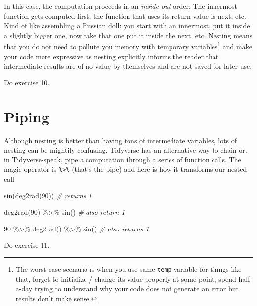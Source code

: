\documentclass[
]{book}
\newenvironment{Shaded}{\begin{snugshade}}{\end{snugshade}}
\newcommand{\CommentTok}[1]{\textcolor[rgb]{0.56,0.35,0.01}{\textit{#1}}}
\newcommand{\DecValTok}[1]{\textcolor[rgb]{0.00,0.00,0.81}{#1}}
\newcommand{\FunctionTok}[1]{\textcolor[rgb]{0.00,0.00,0.00}{#1}}
\newcommand{\NormalTok}[1]{#1}
\newcommand{\SpecialCharTok}[1]{\textcolor[rgb]{0.00,0.00,0.00}{#1}}
\begin{document}
In this case, the computation proceeds in an \emph{inside-out} order: The innermost function gets computed first, the function that uses its return value is next, etc. Kind of like assembling a Russian doll: you start with an innermost, put it inside a slightly bigger one, now take that one put it inside the next, etc. Nesting means that you do not need to pollute you memory with temporary variables\footnote{The worst case scenario is when you use same \texttt{temp} variable for things like that, forget to initialize / change its value properly at some point, spend half-a-day trying to understand why your code does not generate an error but results don't make sense.} and make your code more expressive as nesting explicitly informs the reader that intermediate results are of no value by themselves and are not saved for later use.

Do exercise 10.

\hypertarget{pipe}{%
\section{Piping}\label{pipe}}

Although nesting is better than having tons of intermediate variables, lots of nesting can be mightily confusing. Tidyverse has an alternative way to chain or, in Tidyverse-speak, \href{https://magrittr.tidyverse.org/reference/pipe.html}{pipe} a computation through a series of function calls. The magic operator is \texttt{\%\textgreater{}\%} (that's the pipe) and here is how it transforms our nested call

\begin{Shaded}
\begin{Highlighting}[]
\FunctionTok{sin}\NormalTok{(}\FunctionTok{deg2rad}\NormalTok{(}\DecValTok{90}\NormalTok{)) }\CommentTok{\# returns 1}

\FunctionTok{deg2rad}\NormalTok{(}\DecValTok{90}\NormalTok{) }\SpecialCharTok{\%\textgreater{}\%} \FunctionTok{sin}\NormalTok{() }\CommentTok{\# also return 1}

\DecValTok{90} \SpecialCharTok{\%\textgreater{}\%} \FunctionTok{deg2rad}\NormalTok{() }\SpecialCharTok{\%\textgreater{}\%} \FunctionTok{sin}\NormalTok{() }\CommentTok{\# also returns 1}
\end{Highlighting}
\end{Shaded}

Do exercise 11.
\end{document}
